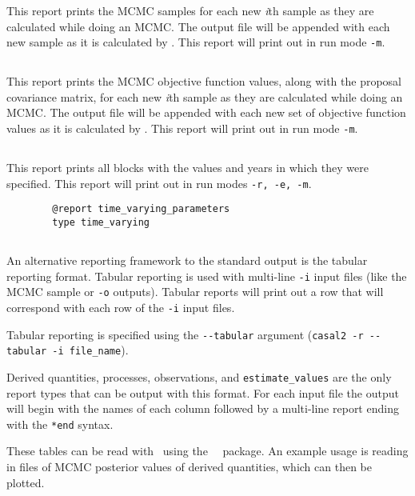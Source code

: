 This report prints the MCMC samples for each new \textit{i}th sample as they are calculated while doing an MCMC. The output file will be appended with each new sample as it is calculated by \CNAME. This report will print out in run mode \texttt{-m}.

\subsection{}\label{sec:Report-MCMCObjective}

This report prints the MCMC objective function values, along with the proposal covariance matrix, for each new \textit{i}th sample as they are calculated while doing an MCMC. The output file will be appended with each new set of objective function values as it is calculated by \CNAME. This report will print out in run mode \texttt{-m}.

\subsection{}\label{sec:Report-TimeVarying}

This report prints all  blocks with the values and years in which they were specified. This report will print out in run modes \texttt{-r, -e, -m}.

{\small{\begin{verbatim}
		@report time_varying_parameters
		type time_varying
		\end{verbatim}}}

\subsection{}\label{sec:Tabular}

An alternative reporting framework to the standard output is the tabular reporting format. Tabular reporting is used with multi-line \texttt{-i} input files (like the MCMC sample or \texttt{-o} outputs). Tabular reports will print out a row that will correspond with each row of the \texttt{-i} input files.

Tabular reporting is specified using the \texttt{-{}-tabular} argument (\texttt{casal2 -r -{}-tabular -i file\_name}).

Derived quantities, processes, observations, and \texttt{estimate\_values} are the only report types that can be output with this format. For each input file the output will begin with the names of each column followed by a multi-line report ending with the \texttt{*end} syntax.

These tables can be read with \R\ using the \CNAME\ \R\ package. An example usage is reading in files of MCMC posterior values of derived quantities, which can then be plotted.


